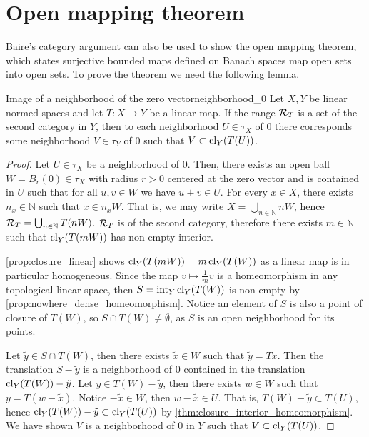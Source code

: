 \section{Open mapping theorem}
Baire's category argument can also be used to show the open mapping theorem, which states surjective bounded maps defined on Banach spaces map open sets into open sets. To prove the theorem we need the following lemma.
\begin{lemma}{Image of a neighborhood of the zero vector}{neighborhood_0}
    Let \(X,Y\) be linear normed spaces and let \(T : X \to Y\) be a linear map. If the range \(\mathcal{R}_{T}\) is a set of the second category in \(Y\), then to each neighborhood \(U \in \tau_X\) of \(0\) there corresponds some neighborhood \(V \in \tau_Y\) of \(0\) such that \(V \subset \operatorname{cl}_Y(T(U))\).
\end{lemma}
\begin{proof}
    Let \(U \in \tau_X\) be a neighborhood of \(0\). Then, there exists an open ball \(W = B_r(0) \in \tau_X\) with radius \(r > 0\) centered at the zero vector and is contained in \(U\) such that for all \(u, v \in W\) we have \(u + v \in U\). For every \(x \in X\), there exists \(n_x \in \mathbb{N}\) such that \(x \in n_x W\). That is, we may write \(X = \bigcup_{n\in \mathbb{N}} nW\), hence \(\mathcal{R}_{T} = \bigcup_{n\in \mathbb{N}} T(nW)\). \(\mathcal{R}_{T}\) is of the second category, therefore there exists \(m \in \mathbb{N}\) such that \(\operatorname{cl}_Y(T(mW))\) has non-empty interior.

    \cref{prop:closure_linear} shows \(\operatorname{cl}_Y(T(mW)) = m \operatorname{cl}_Y(T(W))\) as a linear map is in particular homogeneous. Since the map \(v \mapsto \frac1m v\) is a homeomorphism in any topological linear space, then \(S = \operatorname{int}_Y\operatorname{cl}_Y(T(W))\) is non-empty by \cref{prop:nowhere_dense_homeomorphism}. Notice an element of \(S\) is also a point of closure of \(T(W)\), so \(S \cap T(W) \neq \emptyset\), as \(S\) is an open neighborhood for its points.

    Let \(\tilde{y} \in S \cap T(W)\), then there exists \(\tilde{x} \in W\) such that \(\tilde{y} = Tx\). Then the translation \(S - \tilde{y}\) is a neighborhood of \(0\) contained in the translation \(\operatorname{cl}_Y(T(W)) - \tilde{y}\). Let \(y \in T(W) - \tilde{y}\), then there exists \(w \in W\) such that \(y = T(w - \tilde{x})\). Notice \(-\tilde{x} \in W\), then \(w - \tilde{x} \in U\). That is, \(T(W) - \tilde{y} \subset T(U)\), hence \(\operatorname{cl}_Y(T(W)) - \tilde{y} \subset \operatorname{cl}_Y(T(U))\) by \cref{thm:closure_interior_homeomorphism}. We have shown \(V\) is a neighborhood of \(0\) in \(Y\) such that \(V \subset \operatorname{cl}_Y(T(U))\).
\end{proof}

